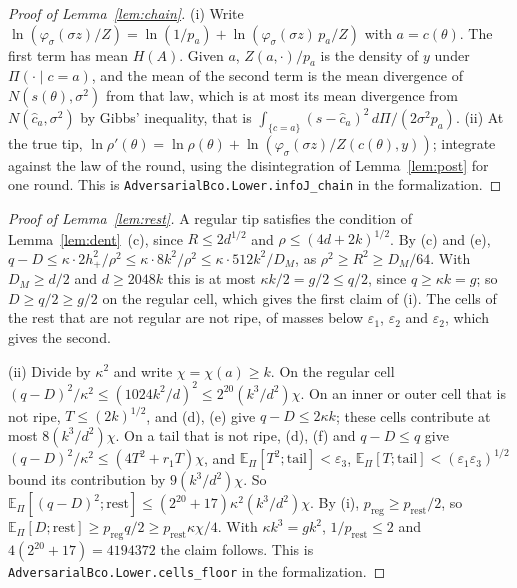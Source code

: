 \documentclass[11pt]{amsart}
\theoremstyle{definition}
\numberwithin{equation}{section}
\newcommand{\E}{\mathbb{E}}
\begin{document}
\begin{proof}[Proof of Lemma~\ref{lem:chain}]
(i) Write $\ln(\varphi_\sigma(\sigma z)/Z)=\ln(1/p_a)+\ln(\varphi_\sigma(\sigma z)\,p_a/Z)$ with $a=c(\theta)$. The first term has mean $H(A)$. Given $a$, $Z(a,\cdot)/p_a$ is the density of $y$ under $\Pi(\cdot\mid c=a)$, and the mean of the second term is the mean divergence of $N(s(\theta),\sigma^2)$ from that law, which is at most its mean divergence from $N(\hat c_a,\sigma^2)$ by Gibbs' inequality, that is $\int_{\{c=a\}}(s-\hat c_a)^2\,d\Pi/(2\sigma^2p_a)$. (ii) At the true tip, $\ln\rho'(\theta)=\ln\rho(\theta)+\ln(\varphi_\sigma(\sigma z)/Z(c(\theta),y))$; integrate against the law of the round, using the disintegration of Lemma~\ref{lem:post} for one round.
This is \texttt{AdversarialBco.Lower.infoJ\_chain} in the formalization.
\end{proof}

\begin{proof}[Proof of Lemma~\ref{lem:rest}]
A regular tip satisfies the condition of Lemma~\ref{lem:dent}~(c), since $R\le2d^{1/2}$ and $\rho\le(4d+2k)^{1/2}$. By (c) and (e), $q-D\le\kappa\cdot2h_+^2/\rho^2\le\kappa\cdot8k^2/\rho^2\le\kappa\cdot512k^2/D_M$, as $\rho^2\ge R^2\ge D_M/64$. With $D_M\ge d/2$ and $d\ge2048k$ this is at most $\kappa k/2=g/2\le q/2$, since $q\ge\kappa k=g$; so $D\ge q/2\ge g/2$ on the regular cell, which gives the first claim of (i). The cells of the rest that are not regular are not ripe, of masses below $\varepsilon_1$, $\varepsilon_2$ and $\varepsilon_2$, which gives the second.

(ii) Divide by $\kappa^2$ and write $\chi=\chi(a)\ge k$. On the regular cell $(q-D)^2/\kappa^2\le(1024k^2/d)^2\le2^{20}(k^3/d^2)\chi$. On an inner or outer cell that is not ripe, $T\le(2k)^{1/2}$, and (d), (e) give $q-D\le2\kappa k$; these cells contribute at most $8(k^3/d^2)\chi$. On a tail that is not ripe, (d), (f) and $q-D\le q$ give $(q-D)^2/\kappa^2\le(4T^2+r_1T)\chi$, and $\E_\Pi[T^2;\mathrm{tail}]<\varepsilon_3$, $\E_\Pi[T;\mathrm{tail}]<(\varepsilon_1\varepsilon_3)^{1/2}$ bound its contribution by $9(k^3/d^2)\chi$. So $\E_\Pi[(q-D)^2;\mathrm{rest}]\le(2^{20}+17)\kappa^2(k^3/d^2)\chi$. By (i), $p_{\mathrm{reg}}\ge p_{\mathrm{rest}}/2$, so $\E_\Pi[D;\mathrm{rest}]\ge p_{\mathrm{reg}}q/2\ge p_{\mathrm{rest}}\kappa\chi/4$. With $\kappa k^3=gk^2$, $1/p_{\mathrm{rest}}\le2$ and $4(2^{20}+17)=4194372$ the claim follows.
This is \texttt{AdversarialBco.Lower.cells\_floor} in the formalization.
\end{proof}
\end{document}
